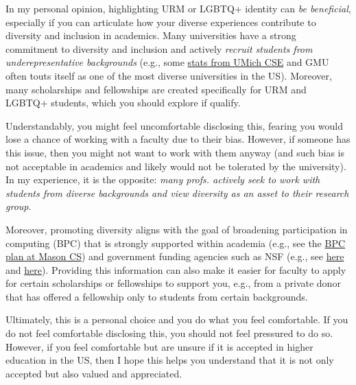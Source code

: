 \documentclass[oneside,11pt,dvipsnames]{book}
\begin{document}
In my personal opinion, highlighting URM or LGBTQ+ identity can \emph{be beneficial}, especially if you can articulate how your diverse experiences contribute to diversity and inclusion in academics.  Many universities have a strong commitment to diversity and inclusion and actively
\emph{recruit students from underepresentative backgrounds} (e.g., some \href{https://cse-climate.engin.umich.edu/reports/climate-dei-reports/cse-climate-and-dei-report-2022-2023/#grad-ethnicity}{stats from UMich CSE} and GMU often touts itself as one of the most diverse universities in the US). Moreover, many scholarships and fellowships are created specifically for URM and LGBTQ+ students, which you should explore if qualify.

Understandably, you might feel uncomfortable disclosing this, fearing you would lose a chance of working with a faculty due to their bias.  However, if someone has this issue, then you might not want to work with them anyway (and such bias is not acceptable in academics and likely would not be tolerated by the university). In my experience, it is the opposite: \emph{many profs. actively seek to work with students from diverse backgrounds and view diversity as an asset to their research group}.

Moreover, promoting diversity aligns with the goal of broadening participation in computing (BPC) that is strongly supported within academia (e.g., see the \href{https://plans.bpcnet.org/GeorgeMasonUniversity_ComputerScience_DepartmentalBPCPlan.pdf}{BPC plan at Mason CS}) and government funding agencies such as NSF (e.g., see \href{https://new.nsf.gov/cise/broadening-participation}{here} and \href{https://www.nsf.gov/pubs/2022/nsf22125/nsf22125.jsp}{here}).
Providing this information can also make it easier for faculty to apply for certain scholarships or fellowships to support you, e.g., from a private donor that has offered a fellowship only to students from certain backgrounds.

Ultimately, this is a personal choice and you do what you feel comfortable.
If you do not feel comfortable disclosing this, you should not feel pressured to do so.
However, if you feel comfortable but are unsure if it is accepted in higher education in the US, then I hope this helps you understand that it is not only accepted but also valued and appreciated.


\end{document}
